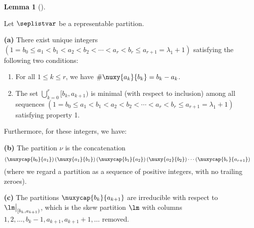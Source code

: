 \documentclass[numbers=enddot,12pt,final,onecolumn,notitlepage]{scrartcl}%
\theoremstyle{definition}
\newtheorem{lem}[theo]{Lemma}
\newenvironment{lemma}[1][]
{\begin{lem}[#1]\begin{leftbar}}
{\end{leftbar}\end{lem}}
\begin{document}
\begin{lemma}
\label{lemma:irreducible}
 Let $\seplistvar$ be a representable partition.

\textbf{(a)} There exist unique integers $(1=b_0\leq a_1<b_1<a_2<b_2<\cdots<a_r<b_r\leq a_{r+1}=\lambda_1+1)$ satisfying the following two conditions:
 \begin{enumerate}
  \item For all $1\leq k\leq r$, we have $\#\nuxy{a_k}{b_k} =b_k-a_k$.
  \item The set $\bigcup_{k=0}^{r}[b_k,a_{k+1})$ is minimal (with respect to inclusion) among all sequences $(1=b_0\leq a_1<b_1<a_2<b_2<\cdots<a_r<b_r\leq a_{r+1}=\lambda_1+1)$ satisfying property 1.
 \end{enumerate}

Furthermore, for these integers, we have:

\textbf{(b)} The partition $\nu$ is the concatenation
\[
\left(\nuxycap{b_0}{a_1}\right) \left(\nuxy{a_1}{b_1}\right) \left(\nuxycap{b_1}{a_2}\right) \left(\nuxy{a_2}{b_2}\right) \cdots \left(\nuxycap{b_r}{a_{r+1}}\right)
\]
(where we regard a partition as a sequence of positive integers, with no trailing zeroes).

\textbf{(c)} The partitions $\nuxycap{b_k}{a_{k+1}}$ are irreducible with respect to $\lm\big|_{[b_k,a_{k+1})}$,
 which is the skew partition $\lm$ with columns $1,2,\dots,b_k-1,a_{k+1},a_{k+1}+1,\dots$ removed.
\end{lemma}
\end{document}
